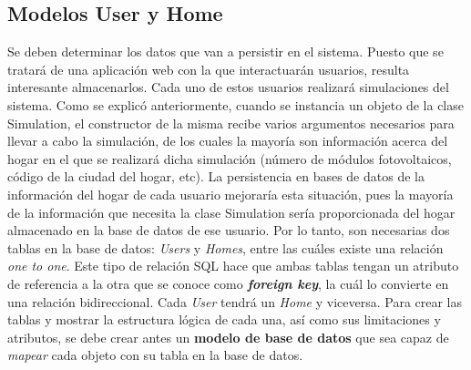 \subsection{Modelos User y Home}
Se deben determinar los datos que van a persistir en el sistema. Puesto que se tratará de una aplicación web con la que interactuarán usuarios, resulta interesante almacenarlos. Cada uno de estos usuarios realizará simulaciones del sistema. Como se explicó anteriormente, cuando se instancia un objeto de la clase Simulation, el constructor de la misma recibe varios argumentos necesarios para llevar a cabo la simulación, de los cuales la mayoría son información acerca del hogar en el que se realizará dicha simulación (número de módulos fotovoltaicos, código de la ciudad del hogar, etc). La persistencia en bases de datos de la información del hogar de cada usuario mejoraría esta situación, pues la mayoría de la información que necesita la clase Simulation sería proporcionada del hogar almacenado en la base de datos de ese usuario. Por lo tanto, son necesarias dos tablas en la base de datos: \textit{Users} y \textit{Homes}, entre las cuáles existe una relación \textit{one to one}. Este tipo de relación SQL hace que ambas tablas tengan un atributo de referencia a la otra que se conoce como \textit{\textbf{foreign key}}, la cuál lo convierte en una relación bidireccional. Cada \textit{User} tendrá un \textit{Home} y viceversa. Para crear las tablas y mostrar la estructura lógica de cada una, así como sus limitaciones y atributos, se debe crear antes un \textbf{modelo de base de datos} que sea capaz de \textit{mapear} cada objeto con su tabla en la base de datos.\\

